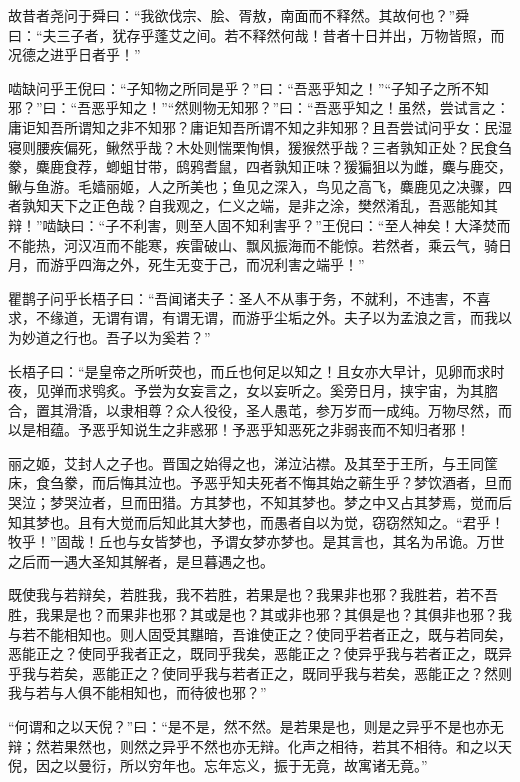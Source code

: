 \documentclass[]{article}
\begin{document}
故昔者尧问于舜曰：``我欲伐宗、脍、胥敖，南面而不释然。其故何也？''舜曰：``夫三子者，犹存乎蓬艾之间。若不释然何哉！昔者十日并出，万物皆照，而况德之进乎日者乎！''

啮缺问乎王倪曰：``子知物之所同是乎？''曰：``吾恶乎知之！''``子知子之所不知邪？''曰：``吾恶乎知之！''``然则物无知邪？''曰：``吾恶乎知之！虽然，尝试言之：庸讵知吾所谓知之非不知邪？庸讵知吾所谓不知之非知邪？且吾尝试问乎女：民湿寝则腰疾偏死，鳅然乎哉？木处则惴栗恂惧，猨猴然乎哉？三者孰知正处？民食刍豢，麋鹿食荐，蝍蛆甘带，鸱鸦耆鼠，四者孰知正味？猨猵狙以为雌，麋与鹿交，鳅与鱼游。毛嫱丽姬，人之所美也；鱼见之深入，鸟见之高飞，麋鹿见之决骤，四者孰知天下之正色哉？自我观之，仁义之端，是非之涂，樊然淆乱，吾恶能知其辩！''啮缺曰：``子不利害，则至人固不知利害乎？''王倪曰：``至人神矣！大泽焚而不能热，河汉冱而不能寒，疾雷破山、飘风振海而不能惊。若然者，乘云气，骑日月，而游乎四海之外，死生无变于己，而况利害之端乎！''

瞿鹊子问乎长梧子曰：``吾闻诸夫子：圣人不从事于务，不就利，不违害，不喜求，不缘道，无谓有谓，有谓无谓，而游乎尘垢之外。夫子以为孟浪之言，而我以为妙道之行也。吾子以为奚若？''

长梧子曰：``是皇帝之所听荧也，而丘也何足以知之！且女亦大早计，见卵而求时夜，见弹而求鸮炙。予尝为女妄言之，女以妄听之。奚旁日月，挟宇宙，为其脗合，置其滑涽，以隶相尊？众人役役，圣人愚芚，参万岁而一成纯。万物尽然，而以是相蕴。予恶乎知说生之非惑邪！予恶乎知恶死之非弱丧而不知归者邪！

丽之姬，艾封人之子也。晋国之始得之也，涕泣沾襟。及其至于王所，与王同筐床，食刍豢，而后悔其泣也。予恶乎知夫死者不悔其始之蕲生乎？梦饮酒者，旦而哭泣；梦哭泣者，旦而田猎。方其梦也，不知其梦也。梦之中又占其梦焉，觉而后知其梦也。且有大觉而后知此其大梦也，而愚者自以为觉，窃窃然知之。``君乎！牧乎！''固哉！丘也与女皆梦也，予谓女梦亦梦也。是其言也，其名为吊诡。万世之后而一遇大圣知其解者，是旦暮遇之也。

既使我与若辩矣，若胜我，我不若胜，若果是也？我果非也邪？我胜若，若不吾胜，我果是也？而果非也邪？其或是也？其或非也邪？其俱是也？其俱非也邪？我与若不能相知也。则人固受其黮暗，吾谁使正之？使同乎若者正之，既与若同矣，恶能正之？使同乎我者正之，既同乎我矣，恶能正之？使异乎我与若者正之，既异乎我与若矣，恶能正之？使同乎我与若者正之，既同乎我与若矣，恶能正之？然则我与若与人俱不能相知也，而待彼也邪？''

``何谓和之以天倪？''曰：``是不是，然不然。是若果是也，则是之异乎不是也亦无辩；然若果然也，则然之异乎不然也亦无辩。化声之相待，若其不相待。和之以天倪，因之以曼衍，所以穷年也。忘年忘义，振于无竟，故寓诸无竟。''
\end{document}
